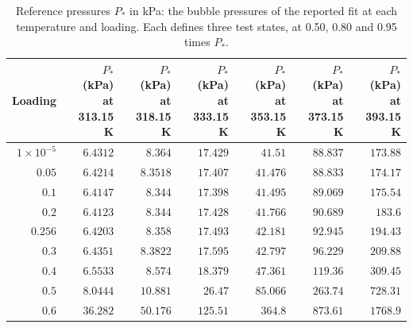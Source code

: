 \begin{table}[!htbp]\small\setlength{\tabcolsep}{3pt}\centering
\caption{Reference pressures $P_*$ in kPa: the bubble pressures of the reported fit at each temperature and loading. Each defines three test states, at 0.50, 0.80 and 0.95 times $P_*$.}\label{tab:phase-reference-pressures}
\begin{tabular}{@{}rrrrrrr@{}}
\toprule
Loading & \makecell[rb]{$P_*$ (kPa)\\at 313.15 K} & \makecell[rb]{$P_*$ (kPa)\\at 318.15 K} & \makecell[rb]{$P_*$ (kPa)\\at 333.15 K} & \makecell[rb]{$P_*$ (kPa)\\at 353.15 K} & \makecell[rb]{$P_*$ (kPa)\\at 373.15 K} & \makecell[rb]{$P_*$ (kPa)\\at 393.15 K} \\
\midrule
$1\times10^{-5}$ & $6.4312$ & $8.364$ & $17.429$ & $41.51$ & $88.837$ & $173.88$ \\
$0.05$ & $6.4214$ & $8.3518$ & $17.407$ & $41.476$ & $88.833$ & $174.17$ \\
$0.1$ & $6.4147$ & $8.344$ & $17.398$ & $41.495$ & $89.069$ & $175.54$ \\
$0.2$ & $6.4123$ & $8.344$ & $17.428$ & $41.766$ & $90.689$ & $183.6$ \\
$0.256$ & $6.4203$ & $8.358$ & $17.493$ & $42.181$ & $92.945$ & $194.43$ \\
$0.3$ & $6.4351$ & $8.3822$ & $17.595$ & $42.797$ & $96.229$ & $209.88$ \\
$0.4$ & $6.5533$ & $8.574$ & $18.379$ & $47.361$ & $119.36$ & $309.45$ \\
$0.5$ & $8.0444$ & $10.881$ & $26.47$ & $85.066$ & $263.74$ & $728.31$ \\
$0.6$ & $36.282$ & $50.176$ & $125.51$ & $364.8$ & $873.61$ & $1768.9$ \\
\bottomrule
\end{tabular}
\end{table}
